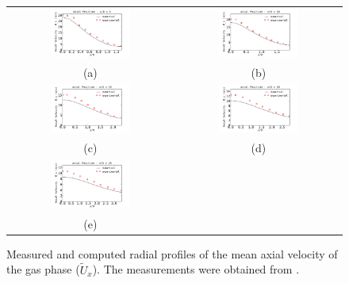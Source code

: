 \documentclass[preprint,12pt,review]{elsarticle}
\begin{document}
\begin{figure}[!htb]
 \centering
\begin{tabular}{cc}
 \includegraphics[width=0.5\textwidth]{../thesis/figuras/chap5/Ux/Ux_gas/Ux_gas5.png} & \includegraphics[width=0.5\textwidth]{../thesis/figuras/chap5/Ux/Ux_gas/Ux_gas10.png} \\
(a) & (b) \\
\includegraphics[width=0.5\textwidth]{../thesis/figuras/chap5/Ux/Ux_gas/Ux_gas15.png} & \includegraphics[width=0.5\textwidth]{../thesis/figuras/chap5/Ux/Ux_gas/Ux_gas20.png} \\
(c) & (d) \\
\includegraphics[width=0.5\textwidth]{../thesis/figuras/chap5/Ux/Ux_gas/Ux_gas25.png} &   \\
(e) & \\
\end{tabular}
 \caption{Measured and computed radial profiles of the mean axial velocity of the gas phase ($\tilde{U}_x$). The measurements were obtained from \citet{chen}.}
 \label{fig: Ux_gas}
\end{figure}
\end{document}
